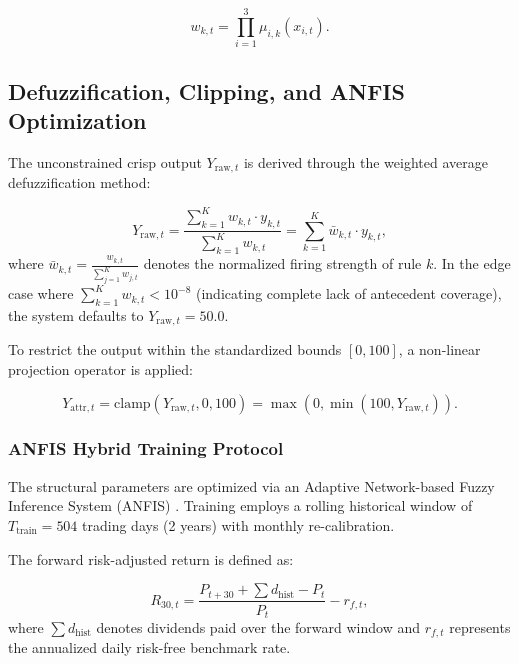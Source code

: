 \documentclass[pdflatex,sn-mathphys-num]{sn-jnl}
\theoremstyle{thmstyleone}
\theoremstyle{thmstyletwo}
\theoremstyle{thmstylethree}
\begin{document}
\begin{equation}
    w_{k,t} = \prod_{i=1}^{3} \mu_{i,k}(x_{i,t}).
    \label{eq:rule_firing}
\end{equation}

\subsection{Defuzzification, Clipping, and ANFIS Optimization}\label{subsec3_3}

The unconstrained crisp output $Y_{\mathrm{raw},t}$ is derived through the weighted average defuzzification method:

\begin{equation}
    Y_{\mathrm{raw},t} = \frac{\sum_{k=1}^{K} w_{k,t} \cdot y_{k,t}}{\sum_{k=1}^{K} w_{k,t}} = \sum_{k=1}^{K} \bar{w}_{k,t} \cdot y_{k,t},
    \label{eq:defuzz_raw}
\end{equation}
where $\bar{w}_{k,t} = \frac{w_{k,t}}{\sum_{j=1}^{K} w_{j,t}}$ denotes the normalized firing strength of rule $k$. In the edge case where $\sum_{k=1}^{K} w_{k,t} < 10^{-8}$ (indicating complete lack of antecedent coverage), the system defaults to $Y_{\mathrm{raw},t} = 50.0$.

To restrict the output within the standardized bounds $[0, 100]$, a non-linear projection operator is applied:

\begin{equation}
    Y_{\mathrm{attr},t} = \mathrm{clamp}(Y_{\mathrm{raw},t}, 0, 100) = \max\left(0, \min\left(100, Y_{\mathrm{raw},t}\right)\right).
    \label{eq:clipping}
\end{equation}

\subsubsection{ANFIS Hybrid Training Protocol}

The structural parameters are optimized via an Adaptive Network-based Fuzzy Inference System (ANFIS) \cite{jang1993}. Training employs a rolling historical window of $T_{\mathrm{train}} = 504$ trading days (2 years) with monthly re-calibration.

The forward risk-adjusted return is defined as:

\begin{equation}
    R_{30,t} = \frac{P_{t+30} + \sum d_{\mathrm{hist}} - P_t}{P_t} - r_{f,t},
    \label{eq:fwd_return}
\end{equation}
where $\sum d_{\mathrm{hist}}$ denotes dividends paid over the forward window and $r_{f,t}$ represents the annualized daily risk-free benchmark rate.
\end{document}
